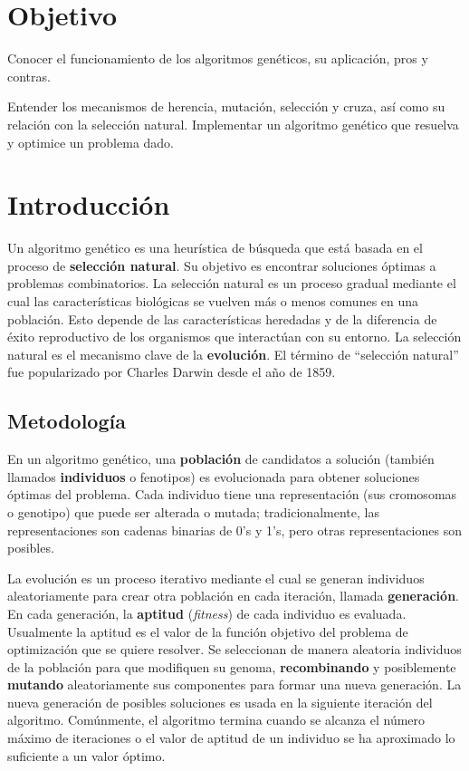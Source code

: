 

\section{Objetivo}
Conocer el funcionamiento de los algoritmos genéticos, su aplicación, pros y contras.\par
Entender los mecanismos de herencia, mutación, selección y cruza, así como su relación con la selección natural.
Implementar un algoritmo genético que resuelva y optimice un problema dado.

\section{Introducci\'on}

Un algoritmo genético es una heurística de búsqueda que está basada en el proceso de \textbf{selección natural}.  Su objetivo es encontrar soluciones óptimas a problemas combinatorios. La selección natural es un proceso gradual mediante el cual las características biológicas se vuelven más o menos comunes en una población. Esto depende de las características heredadas y de la diferencia de éxito reproductivo de los organismos que interactúan con su entorno. La selección natural es el mecanismo clave de la \textbf{evolución}. El término de “selección natural” fue popularizado por Charles Darwin desde el año de 1859.

\subsection{Metodolog\'ia}

En un algoritmo genético, una \textbf{población} de candidatos a solución (también llamados \textbf{individuos} o fenotipos) es evolucionada para obtener soluciones óptimas del problema. Cada individuo tiene una representación (sus cromosomas o genotipo) que puede ser alterada o mutada; tradicionalmente, las representaciones son cadenas binarias de 0’s y 1’s, pero otras representaciones son posibles.\par

La evolución es un proceso iterativo mediante el cual se generan individuos aleatoriamente para crear otra población en cada iteración, llamada \textbf{generación}. En cada generación, la \textbf{aptitud} (\textit{fitness}) de cada individuo es evaluada. Usualmente la aptitud es el valor de la función objetivo del problema de optimización que se quiere resolver. Se seleccionan de manera aleatoria individuos de la población para que modifiquen su genoma, \textbf{recombinando} y posiblemente \textbf{mutando} aleatoriamente sus componentes para formar una nueva generación. La nueva generación de posibles soluciones es usada en la siguiente iteración del algoritmo. Comúnmente, el algoritmo termina cuando se alcanza el número máximo de iteraciones o el valor de aptitud de un individuo se ha aproximado lo suficiente a un valor óptimo.

